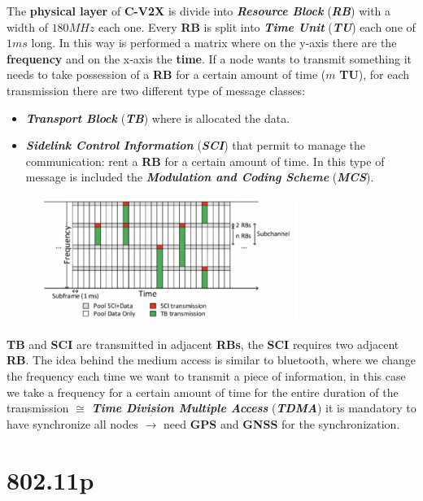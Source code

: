 The \textbf{physical layer} of \textbf{C-V2X} is divide into \textbf{\textit{Resource Block}} (\textbf{\textit{RB}}) with a width of $180MHz$ each one. Every \textbf{RB} is split into \textbf{\textit{Time Unit}} (\textbf{\textit{TU}}) each one of $1ms$ long. In this way is performed a matrix where on the y-axis there are the \textbf{frequency} and on the x-axis the \textbf{time}. If a node wants to transmit something it needs to take possession of a \textbf{RB} for a certain amount of time ($m$ \textbf{TU}), for each transmission there are two different type of message classes:
\begin{itemize}[nosep]
    \item \textbf{\textit{Transport Block}} (\textbf{\textit{TB}}) where is allocated the data.
    \item \textbf{\textit{Sidelink Control Information}} (\textbf{\textit{SCI}}) that permit to manage the communication: rent a \textbf{RB} for a certain amount of time. In this type of message is included the \textbf{\textit{Modulation and Coding Scheme}} (\textbf{\textit{MCS}}).
\end{itemize}

\begin{figure}[h]
    \centering
    \includegraphics[width=0.75\textwidth]{img/cv2x}
\end{figure}
\textbf{TB} and \textbf{SCI} are transmitted in adjacent \textbf{RBs}, the \textbf{SCI} requires two adjacent \textbf{RB}. The idea behind the medium access is similar to bluetooth, where we change the frequency each time we want to transmit a piece of information, in this case we take a frequency for a certain amount of time for the entire duration of the transmission $\cong$ \textbf{\textit{Time Division Multiple Access}} (\textbf{\textit{TDMA}}) it is mandatory to have synchronize all nodes $\rightarrow$ need \textbf{GPS} and \textbf{GNSS} for the synchronization.

\section{802.11p}

